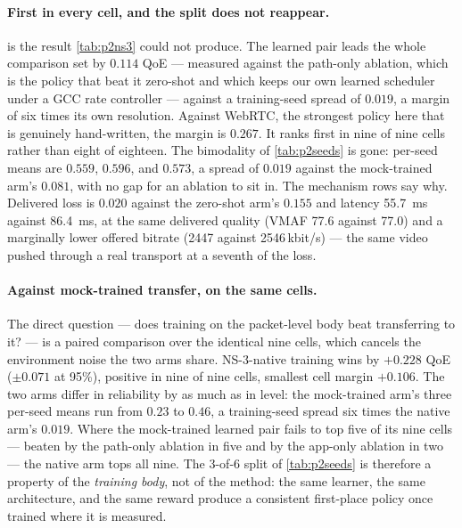 \paragraph{First in every cell, and the split does not reappear.}  is the result
\cref{tab:p2ns3} could not produce. The learned pair leads the whole comparison set by $0.114$ QoE ---
measured against the path-only ablation, which is the policy that beat it zero-shot and which keeps our
own learned scheduler under a GCC rate controller --- against a training-seed spread of $0.019$, a
margin of six times its own resolution. Against WebRTC, the strongest policy here that is genuinely
hand-written, the margin is $0.267$. It ranks first in nine of nine cells rather than eight of eighteen. The bimodality of \cref{tab:p2seeds} is gone: per-seed means
are $0.559$, $0.596$, and $0.573$, a spread of $0.019$ against the mock-trained arm's $0.081$, with no
gap for an ablation to sit in. The mechanism rows say why. Delivered loss is $0.020$ against the
zero-shot arm's $0.155$ and latency \SI{55.7}{\milli\second} against \SI{86.4}{\milli\second}, at the
same delivered quality (VMAF 77.6 against 77.0) and a marginally lower offered bitrate (2447 against
2546\,kbit/s) --- the same video pushed through a real transport at a seventh of the loss.

\paragraph{Against mock-trained transfer, on the same cells.} The direct question --- does training on
the packet-level body beat transferring to it? --- is a paired comparison over the identical nine cells,
which cancels the environment noise the two arms share. NS-3-native training wins by $\mathbf{+0.228}$
QoE ($\pm 0.071$ at 95\%), positive in nine of nine cells, smallest cell margin $+0.106$. The two arms
differ in reliability by as much as in level: the mock-trained arm's three per-seed means run from
$0.23$ to $0.46$, a training-seed spread six times the native arm's $0.019$. Where the
mock-trained learned pair fails to top five of its nine cells --- beaten by the path-only ablation in
five and by the app-only ablation in two --- the native arm tops all nine. The 3-of-6 split of
\cref{tab:p2seeds} is therefore a property of the \emph{training body}, not of the method: the same
learner, the same architecture, and the same reward produce a consistent first-place policy once trained
where it is measured.

